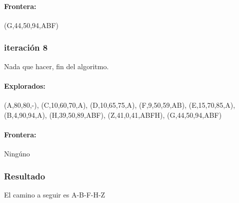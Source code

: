 \documentclass[a4paper,10pt]{article}
\begin{document}
\paragraph{Frontera:}(G,44,50,94,ABF)

\subsubsection{iteración 8}
Nada que hacer, fin del algoritmo.
\paragraph{Explorados:}(A,80,80,-), (C,10,60,70,A), (D,10,65,75,A), (F,9,50,59,AB), (E,15,70,85,A), (B,4,90,94,A), (H,39,50,89,ABF), (Z,41,0,41,ABFH), (G,44,50,94,ABF)
\paragraph{Frontera:} Ningúno

\subsubsection{Resultado}
El camino a seguir es A-B-F-H-Z

\pagebreak



% 
% 
% 
\end{document}
